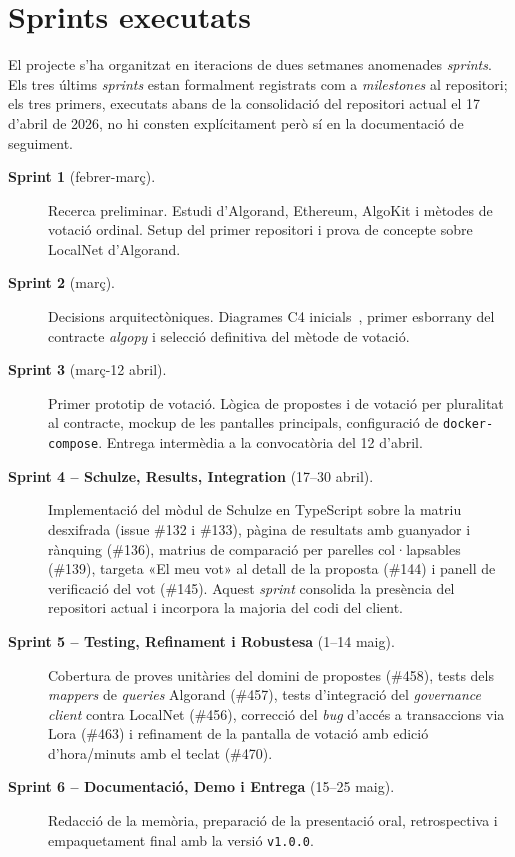 \section{Sprints executats}
\label{sec:sprints}

El projecte s'ha organitzat en iteracions de dues setmanes anomenades \emph{sprints}.
Els tres últims \emph{sprints} estan formalment registrats com a \emph{milestones} al repositori; els tres primers,
executats abans de la consolidació del repositori actual el 17 d'abril de 2026, no hi consten explícitament però sí en
la documentació de seguiment.

\begin{description}
    \item[\textbf{Sprint 1} (febrer-març).] Recerca preliminar.
    Estudi d'Algorand, Ethereum, AlgoKit i mètodes de votació ordinal.
    Setup del primer repositori i prova de concepte sobre LocalNet d'Algorand.

    \item[\textbf{Sprint 2} (març).] Decisions arquitectòniques.
    Diagrames C4 inicials~\cite{brown2018c4}, primer esborrany del contracte \emph{algopy} i selecció definitiva del
    mètode de votació.

    \item[\textbf{Sprint 3} (març-12 abril).] Primer prototip de votació.
    Lògica de propostes i de votació per pluralitat al contracte, mockup de les pantalles principals, configuració de
    \texttt{docker-compose}.
    Entrega intermèdia a la convocatòria del 12 d'abril.

    \item[\textbf{Sprint 4 -- Schulze, Results, Integration} (17--30 abril).] Implementació del mòdul de Schulze en
    TypeScript sobre la matriu desxifrada (issue \#132 i \#133), pàgina de resultats amb guanyador i rànquing (\#136),
    matrius de comparació per parelles col·lapsables (\#139), targeta «El meu vot» al detall de la proposta (\#144) i
    panell de verificació del vot (\#145).
    Aquest \emph{sprint} consolida la presència del repositori actual i incorpora la majoria del codi del client.

    \item[\textbf{Sprint 5 -- Testing, Refinament i Robustesa} (1--14 maig).] Cobertura de proves unitàries del domini
    de propostes (\#458), tests dels \emph{mappers} de \emph{queries} Algorand (\#457), tests d'integració del
    \emph{governance client} contra LocalNet (\#456), correcció del \emph{bug} d'accés a transaccions via Lora (\#463) i
    refinament de la pantalla de votació amb edició d'hora/minuts amb el teclat (\#470).

    \item[\textbf{Sprint 6 -- Documentació, Demo i Entrega} (15--25 maig).] Redacció de la memòria, preparació de la
    presentació oral, retrospectiva i empaquetament final amb la versió \texttt{v1.0.0}.
\end{description}

